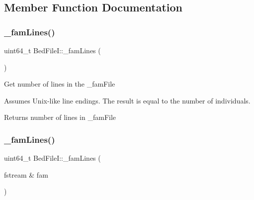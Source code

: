 \subsection{Member Function Documentation}
\mbox{\label{classsamp_files_1_1_bed_file_i_a40dbd1c78781d4eb32f59620624bfa8a}} 
\subsubsection{\texorpdfstring{\+\_\+fam\+Lines()}{\_famLines()}\hspace{0.1cm}{\footnotesize\ttfamily [1/2]}}
{\footnotesize\ttfamily uint64\+\_\+t Bed\+File\+I\+::\+\_\+fam\+Lines (\begin{DoxyParamCaption}{ }\end{DoxyParamCaption})\hspace{0.3cm}{\ttfamily [protected]}}



Get number of lines in the {\ttfamily \+\_\+fam\+File} 

Assumes Unix-\/like line endings. The result is equal to the number of individuals.

\begin{DoxyReturn}{Returns}
number of lines in {\ttfamily \+\_\+fam\+File} 
\end{DoxyReturn}
\mbox{\label{classsamp_files_1_1_bed_file_i_ad0898ea2f902dbd7c01e66ae3133c0b9}} 
\subsubsection{\texorpdfstring{\+\_\+fam\+Lines()}{\_famLines()}\hspace{0.1cm}{\footnotesize\ttfamily [2/2]}}
{\footnotesize\ttfamily uint64\+\_\+t Bed\+File\+I\+::\+\_\+fam\+Lines (\begin{DoxyParamCaption}\item[{fstream \&}]{fam }\end{DoxyParamCaption})\hspace{0.3cm}{\ttfamily [protected]}}



